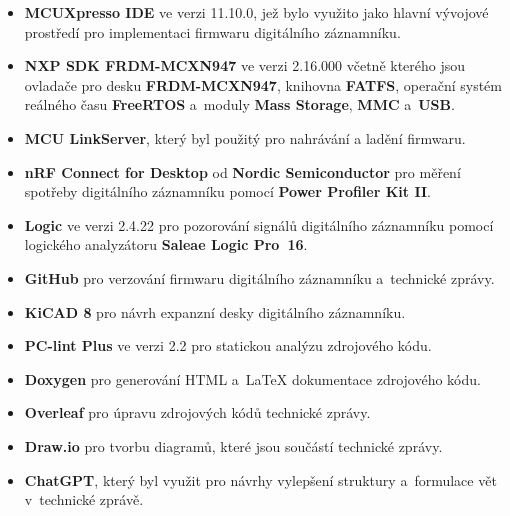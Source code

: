 \begin{itemize}
    \item \textbf{MCUXpresso IDE} ve verzi 11.10.0, jež bylo využito jako hlavní vývojové prostředí pro implementaci firmwaru digitálního záznamníku.
    \item \textbf{NXP SDK FRDM-MCXN947} ve verzi 2.16.000 včetně kterého jsou ovladače pro desku \textbf{FRDM-MCXN947}, knihovna \textbf{FATFS}, operační systém reálného času \textbf{FreeRTOS} a~moduly \textbf{Mass Storage}, \textbf{MMC} a~\textbf{USB}.
    \item \textbf{MCU LinkServer}, který byl použitý pro nahrávání a ladění firmwaru.
    \item \textbf{nRF Connect for Desktop} od \textbf{Nordic Semiconductor} pro měření spotřeby digitálního záznamníku pomocí \textbf{Power Profiler Kit II}.
    \item \textbf{Logic} ve verzi 2.4.22 pro pozorování signálů digitálního záznamníku pomocí logického analyzátoru \textbf{Saleae Logic Pro~16}.
    \item \textbf{GitHub} pro verzování firmwaru digitálního záznamníku a~technické zprávy.
    \item \textbf{KiCAD 8} pro návrh expanzní desky digitálního záznamníku.
    \item \textbf{PC-lint Plus} ve verzi 2.2 pro statickou analýzu zdrojového kódu. 
    \item \textbf{Doxygen} pro generování HTML a~LaTeX dokumentace zdrojového kódu.
    \item \textbf{Overleaf} pro úpravu zdrojových kódů technické zprávy.
    \item \textbf{Draw.io} pro tvorbu diagramů, které jsou součástí technické zprávy.
    \item \textbf{ChatGPT}, který byl využit pro návrhy vylepšení struktury a~formulace vět v~technické zprávě.
\end{itemize}

%
